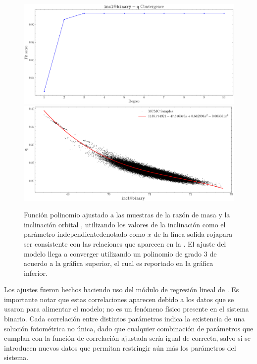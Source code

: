 \begin{figure}[!ht]
    \centering
    \includegraphics[scale=0.4]{Conclusion/Figures/Figura q-incl Correlacion Convergencia.png}
    \includegraphics[scale=0.4]{Conclusion/Figures/Figura q-incl Correlacion.png}
    \caption{Función polinomio ajustado a las muestras de la razón de masa
     y la inclinación orbital , utilizando los valores
    de la inclinación como el parámetro independiente\textemdash denotado como
    $x$ de la línea solida roja\textemdash para ser consistente con las
    relaciones que aparecen en la .
    El ajuste del modelo llega a converger utilizando un polinomio de grado 3 de
    acuerdo a la gráfica superior, el cual es reportado en la gráfica inferior.}
    \label{figuraCorrelacion_q_incl}
\end{figure}

Los ajustes fueron hechos haciendo uso del módulo de regresión lineal de
\href{https://scikit-learn.org/stable/modules/generated/sklearn.linear_model.LinearRegression.html}{}.
Es importante notar que estas correlaciones aparecen debido a los datos que se
usaron para alimentar el modelo; no es un fenómeno físico presente en el sistema
binario. Cada correlación entre distintos parámetros indica la existencia de una
solución fotométrica no única, dado que cualquier combinación de parámetros que
cumplan con la función de correlación ajustada sería igual de correcta, salvo si
se introducen nuevos datos que permitan restringir aún más los parámetros del
sistema. 

